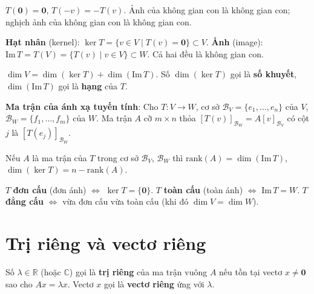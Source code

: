 \documentclass[12pt,a4paper]{article}
\begin{document}
\begin{tinhchat}
  $T(\mathbf{0}) = \mathbf{0}$, $T(-v) = -T(v)$. Ảnh của không gian con là không gian con; nghịch ảnh của không gian con là không gian con.
\end{tinhchat}

\begin{dinhnghia}
  \textbf{Hạt nhân} (kernel): $\ker T = \{v \in V \mid T(v) = \mathbf{0}\} \subset V$. \textbf{Ảnh} (image): $\mathrm{Im}\,T = T(V) = \{T(v) \mid v \in V\} \subset W$. Cả hai đều là không gian con.
\end{dinhnghia}

\begin{dinhly}[title={Định lý chiều}]
  $\dim V = \dim(\ker T) + \dim(\mathrm{Im}\,T)$. Số $\dim(\ker T)$ gọi là \textbf{số khuyết}, $\dim(\mathrm{Im}\,T)$ gọi là \textbf{hạng} của $T$.
\end{dinhly}

\begin{dinhnghia}
  \textbf{Ma trận của ánh xạ tuyến tính}: Cho $T: V \to W$, cơ sở $\mathcal{B}_V = \{e_1, \ldots, e_n\}$ của $V$, $\mathcal{B}_W = \{f_1, \ldots, f_m\}$ của $W$. Ma trận $A$ cỡ $m \times n$ thỏa $[T(v)]_{\mathcal{B}_W} = A [v]_{\mathcal{B}_V}$ có cột $j$ là $[T(e_j)]_{\mathcal{B}_W}$.
\end{dinhnghia}

\begin{dinhly}
  Nếu $A$ là ma trận của $T$ trong cơ sở $\mathcal{B}_V$, $\mathcal{B}_W$ thì $\mathrm{rank}(A) = \dim(\mathrm{Im}\,T)$, $\dim(\ker T) = n - \mathrm{rank}(A)$.
\end{dinhly}

\begin{dinhnghia}
  $T$ \textbf{đơn cấu} (đơn ánh) $\Leftrightarrow$ $\ker T = \{\mathbf{0}\}$. $T$ \textbf{toàn cấu} (toàn ánh) $\Leftrightarrow$ $\mathrm{Im}\,T = W$. $T$ \textbf{đẳng cấu} $\Leftrightarrow$ vừa đơn cấu vừa toàn cấu (khi đó $\dim V = \dim W$).
\end{dinhnghia}

\section{Trị riêng và vectơ riêng}

\begin{dinhnghia}
  Số $\lambda \in \mathbb{R}$ (hoặc $\mathbb{C}$) gọi là \textbf{trị riêng} của ma trận vuông $A$ nếu tồn tại vectơ $x \ne \mathbf{0}$ sao cho $Ax = \lambda x$. Vectơ $x$ gọi là \textbf{vectơ riêng} ứng với $\lambda$.
\end{dinhnghia}
\end{document}
